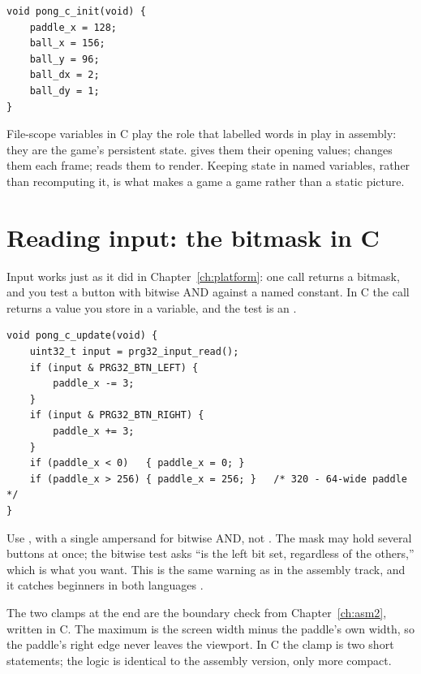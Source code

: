 \begin{lstlisting}[style=c,caption={Initialising state in \code{init}. This runs once, before the first frame.}]
void pong_c_init(void) {
    paddle_x = 128;
    ball_x = 156;
    ball_y = 96;
    ball_dx = 2;
    ball_dy = 1;
}
\end{lstlisting}

\begin{prgconcept}
File-scope variables in C play the role that labelled words in  play
in assembly: they are the game's persistent state.  gives them their
opening values;  changes them each frame;  reads them to
render. Keeping state in named variables, rather than recomputing it, is what
makes a game a game rather than a static picture.
\end{prgconcept}

\section{Reading input: the bitmask in C}

Input works just as it did in Chapter~\ref{ch:platform}: one call returns a
bitmask, and you test a button with bitwise AND against a named constant. In C the
call returns a value you store in a variable, and the test is an .

\begin{lstlisting}[style=c,caption={Reading input and moving the paddle. Note the bitwise \texttt{\&}, not \texttt{==}, exactly as warned in Chapter~\ref{ch:platform}.}]
void pong_c_update(void) {
    uint32_t input = prg32_input_read();
    if (input & PRG32_BTN_LEFT) {
        paddle_x -= 3;
    }
    if (input & PRG32_BTN_RIGHT) {
        paddle_x += 3;
    }
    if (paddle_x < 0)   { paddle_x = 0; }
    if (paddle_x > 256) { paddle_x = 256; }   /* 320 - 64-wide paddle */
}
\end{lstlisting}

\begin{prgwarn}
Use , with a single ampersand for bitwise AND, not
. The mask may hold several buttons at once; the
bitwise test asks ``is the left bit set, regardless of the others,'' which is what
you want. This is the same warning as in the assembly track, and it catches
beginners in both languages \citep{prg32tutorialc}.
\end{prgwarn}

The two clamps at the end are the boundary check from Chapter~\ref{ch:asm2},
written in C. The maximum is the screen width minus the paddle's own width, so the
paddle's right edge never leaves the viewport. In C the clamp is two short
 statements; the logic is identical to the assembly version, only more
compact.

